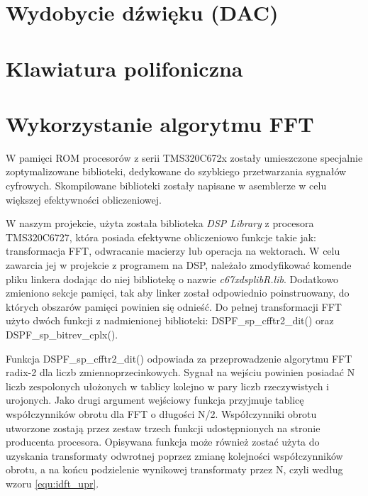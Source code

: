 \section{Wydobycie dźwięku (DAC)}



\section{Klawiatura polifoniczna}




\section{Wykorzystanie algorytmu FFT}


W pamięci ROM procesorów z serii TMS320C672x zostały umieszczone specjalnie zoptymalizowane biblioteki, dedykowane do szybkiego przetwarzania sygnałów cyfrowych. Skompilowane biblioteki zostały napisane w asemblerze w celu większej efektywności obliczeniowej. 

W naszym projekcie, użyta została biblioteka \emph{DSP Library} z procesora TMS320C6727, która posiada efektywne obliczeniowo funkcje takie jak: transformacja FFT, odwracanie macierzy lub operacja na wektorach. W celu zawarcia jej w projekcie z programem na DSP, należało zmodyfikować komende pliku linkera dodając do niej bibliotekę o nazwie \emph{c67xdsplibR.lib}. Dodatkowo zmieniono sekcje pamięci, tak aby linker został odpowiednio poinstruowany, do których obszarów pamięci powinien się odnieść. Do pełnej transformacji FFT użyto dwóch funkcji z nadmienionej biblioteki: DSPF\_sp\_cfftr2\_dit() oraz DSPF\_sp\_bitrev\_cplx(). 

Funkcja DSPF\_sp\_cfftr2\_dit() odpowiada za przeprowadzenie algorytmu FFT radix-2 dla liczb zmiennoprzecinkowych. Sygnał na wejściu powinien posiadać N liczb zespolonych ułożonych w tablicy kolejno w pary liczb rzeczywistych i urojonych. Jako drugi argument wejściowy funkcja przyjmuje tablicę współczynników obrotu dla FFT o długości N/2. Współczynniki obrotu utworzone zostają przez zestaw trzech funkcji udostępnionych na stronie producenta procesora. %
Opisywana funkcja może również zostać użyta do uzyskania transformaty odwrotnej poprzez zmianę kolejności współczynników obrotu, a na końcu podzielenie wynikowej transformaty przez N, czyli według wzoru \ref{equ:idft_upr}.

